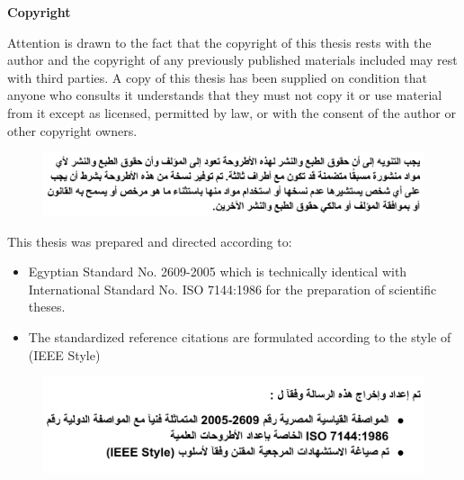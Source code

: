 \begin{center}
\textbf{Copyright}
\end{center}
\vskip 50pt

Attention is drawn to the fact that the copyright of this thesis rests with the author and the copyright of any previously published materials included may rest with third parties. A copy of this thesis has been supplied on condition that anyone who consults it understands that they must not copy it or use material from it except as licensed, permitted by law, or with the consent of the author or other copyright owners.

\begin{figure}[H]
    \centering
    \includegraphics[width=1\linewidth]{images/copyright_1.png}
\end{figure}

This thesis was prepared and directed according to: 

\begin{itemize}
  \item Egyptian Standard No. 2609-2005 which is technically identical with International Standard No. ISO 7144:1986 for the preparation of scientific theses.
  \item The standardized reference citations are formulated according to the style of (IEEE Style) 
\end{itemize}

\begin{figure}[H]
    \centering
    \includegraphics[width=1\linewidth]{images/copyright_2.png}
\end{figure}
